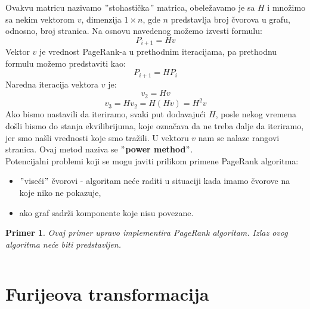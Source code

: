 \documentclass[a4paper]{article}
\newtheorem{primer}{Primer}[section]
\begin{document}
Ovakvu matricu nazivamo $"$stohastička$"$ matrica, obeležavamo je sa $H$ i množimo sa nekim vektorom $v$, dimenzija $1 \times n$, gde $n$ predstavlja broj čvorova u grafu, odnosno, broj stranica. Na osnovu navedenog možemo izvesti formulu:
\begin{equation}
P_{i+1} = Hv
\end{equation}
Vektor $v$ je vrednost PageRank-a u prethodnim iteracijama, pa prethodnu formulu možemo predstaviti kao:
\begin{equation}
P_{i+1} = HP_i
\end{equation}
Naredna iteracija vektora $v$ je:
\begin{equation}
v_2 = Hv
\end{equation}
\begin{equation}
v_3 = Hv_2 = H(Hv) = H^2v
\end{equation}
Ako bismo nastavili da iteriramo, svaki put dodavajući $H$, posle nekog vremena došli bismo do stanja ekvilibrijuma, koje označava da ne treba dalje da iteriramo, jer smo našli vrednosti koje smo tražili. U vektoru $v$ nam se nalaze rangovi stranica. Ovaj metod naziva se \textbf{$"$power method$"$}.\\
Potencijalni problemi koji se mogu javiti prilikom primene PageRank algoritma:
\begin{itemize}
\item $"$viseći$"$ čvorovi - algoritam neće raditi u situaciji kada imamo čvorove na koje niko ne pokazuje,
\item ako graf sadrži komponente koje nisu povezane.
\end{itemize} 
\begin{primer} 
Ovaj primer upravo implementira PageRank algoritam. Izlaz ovog algoritma neće biti predstavljen.
\inputminted{python}{Codes/2/3-pagerank.py}
\end{primer}
\newpage
\section{Furijeova transformacija}
\end{document}
